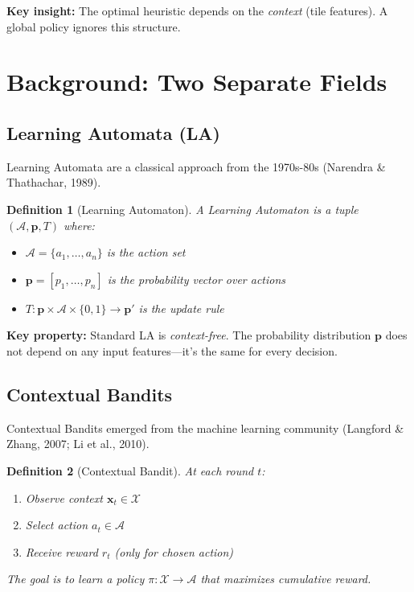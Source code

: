 \documentclass[11pt]{article}
\newtheorem{definition}{Definition}
\begin{document}
\textbf{Key insight:} The optimal heuristic depends on the \textit{context} (tile features). A global policy ignores this structure.

\section{Background: Two Separate Fields}

\subsection{Learning Automata (LA)}

Learning Automata are a classical approach from the 1970s-80s (Narendra \& Thathachar, 1989).

\begin{definition}[Learning Automaton]
A Learning Automaton is a tuple $(\mathcal{A}, \mathbf{p}, T)$ where:
\begin{itemize}
  \item $\mathcal{A} = \{a_1, \ldots, a_n\}$ is the action set
  \item $\mathbf{p} = [p_1, \ldots, p_n]$ is the probability vector over actions
  \item $T: \mathbf{p} \times \mathcal{A} \times \{0,1\} \to \mathbf{p}'$ is the update rule
\end{itemize}
\end{definition}

\textbf{Key property:} Standard LA is \textit{context-free}. The probability distribution $\mathbf{p}$ does not depend on any input features---it's the same for every decision.

\subsection{Contextual Bandits}

Contextual Bandits emerged from the machine learning community (Langford \& Zhang, 2007; Li et al., 2010).

\begin{definition}[Contextual Bandit]
At each round $t$:
\begin{enumerate}
  \item Observe context $\mathbf{x}_t \in \mathcal{X}$
  \item Select action $a_t \in \mathcal{A}$
  \item Receive reward $r_t$ (only for chosen action)
\end{enumerate}
The goal is to learn a policy $\pi: \mathcal{X} \to \mathcal{A}$ that maximizes cumulative reward.
\end{definition}
\end{document}
